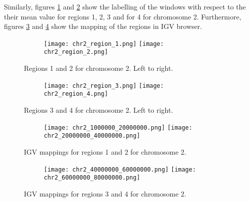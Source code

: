 \documentclass[12pt]{article}
\begin{document}

	

Similarly, figures \ref{fig:rslt_image5} and \ref{fig:rslt_image6} show the labelling of the windows with respect to the their mean value for regions 1, 2, 3 and for 4 for chromosome 2. Furthermore, figures \ref{fig:rslt_image7} and \ref{fig:rslt_image8} show the mapping of the regions in IGV browser.

\begin{figure}[h]
	\begin{subfigure}{}
		\texttt{[image: chr2\_region\_1.png]}
		\texttt{[image: chr2\_region\_2.png]}
	\end{subfigure}
	\caption{Regions 1 and  2 for chromosome 2. Left to right.}
	\label{fig:rslt_image5}
\end{figure}


\begin{figure}[h]
	\begin{subfigure}{}
		\texttt{[image: chr2\_region\_3.png]}
		\texttt{[image: chr2\_region\_4.png]}
	\end{subfigure}
	\caption{Regions 3 and 4  for chromosome 2. Left to right.}
	\label{fig:rslt_image6}
\end{figure}

\begin{figure}[!htb]
	\begin{subfigure}{}
		\texttt{[image: chr2\_1000000\_20000000.png]}
		\texttt{[image: chr2\_20000000\_40000000.png]}
	\end{subfigure}
	\caption{IGV mappings for regions 1 and 2  for chromosome 2.}
	\label{fig:rslt_image7}
\end{figure}

\begin{figure}[!htb]
	\begin{subfigure}{}
		\texttt{[image: chr2\_40000000\_60000000.png]}
		\texttt{[image: chr2\_60000000\_80000000.png]}
	\end{subfigure}
	\caption{IGV mappings for regions 3 and 4  for chromosome 2.}
	\label{fig:rslt_image8}
\end{figure}
\end{document}
